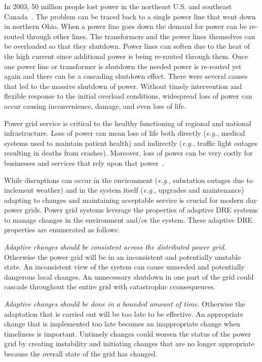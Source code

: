 \documentclass[conference]{IEEEtran}
\begin{document}
In 2003, 50 million people lost power in the northeast U.S. and southeast Canada~\cite{Minkel:08}. The problem can be traced back to a single power line that went down in northern Ohio. When a power line goes down the demand for power can be re-routed through other lines. The transformers and the power lines themselves can be overloaded so that they shutdown. Power lines can soften due to the heat of the high current since additional power is being re-routed through them. Once one power line or transformer is shutdown the needed power is re-routed yet again and there can be a cascading shutdown effect. There were several causes that led to the massive shutdown of power. Without timely intervention and flexible response to the initial overload conditions, widespread loss of power can occur causing inconvenience, damage, and even loss of life.

Power grid service is critical to the healthy functioning of regional and national infrastructure. Loss of power can mean loss of life both directly (\emph{e.g.}, medical systems used to maintain patient health) and indirectly (\emph{e.g.}, traffic light outages resulting in deaths from crashes). Moreover, loss of power can be very costly for businesses and services that rely upon that power~\cite{Chen:10}.

While disruptions can occur in the environment (\emph{e.g.}, substation outages due to inclement weather) and in the system itself (\emph{e.g.}, upgrades and maintenance) adapting to changes and maintaining acceptable service is crucial for modern day power grids. Power grid systems leverage the properties of adaptive DRE systems to manage changes in the environment and/or the system. These adaptive DRE properties are enumerated as follows:

\emph{Adaptive changes should be consistent across the distributed power grid.} Otherwise the power grid will be in an inconsistent and potentially unstable state. An inconsistent view of the system can cause unneeded and potentially dangerous local changes. An unnecessary shutdown in one part of the grid could cascade throughout the entire grid with catastrophic cconsequences.

\emph{Adaptive changes should be done in a bounded amount of time.} Otherwise the adaptation that is carried out will be too late to be effective. An appropriate change that is implemented too late becomes an inappropriate change when timeliness is important. Untimely changes could worsen the status of the power grid by creating instability and initiating changes that are no longer appropriate because the overall state of the grid has changed.
\end{document}
